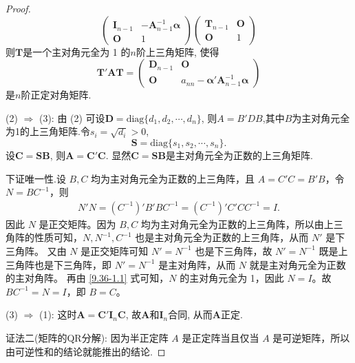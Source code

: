 \documentclass[../../main.tex]{subfiles}%
\begin{document}
\begin{proof}
\[\begin{pmatrix}
\boldsymbol{I}_{n - 1} & -\boldsymbol{A}_{n - 1}^{-1}\boldsymbol{\alpha} \\
\boldsymbol{O} & 1
\end{pmatrix}
\begin{pmatrix}
\boldsymbol{T}_{n - 1} & \boldsymbol{O} \\
\boldsymbol{O} & 1
\end{pmatrix}
\]
则$\boldsymbol{T}$是一个主对角元全为 1 的$n$阶上三角矩阵, 使得
\[
\boldsymbol{T}'\boldsymbol{A}\boldsymbol{T}=\begin{pmatrix}
\boldsymbol{D}_{n - 1} & \boldsymbol{O} \\
\boldsymbol{O} & a_{nn}-\boldsymbol{\alpha}'\boldsymbol{A}_{n - 1}^{-1}\boldsymbol{\alpha}
\end{pmatrix}
\]
是$n$阶正定对角矩阵.

(2) $\Rightarrow$ (3): 由 (2) 可设$\boldsymbol{D}=\text{diag}\{d_1, d_2, \cdots, d_n\}$, 则$A=B'DB$,其中$B$为主对角元全为1的上三角矩阵.令$s_i = \sqrt{d_i}>0$,
\[
\boldsymbol{S}=\text{diag}\{s_1, s_2, \cdots, s_n\}.
\]
设$\boldsymbol{C}=\boldsymbol{S}\boldsymbol{B}$, 则$\boldsymbol{A}=\boldsymbol{C}'\boldsymbol{C}$. 显然$\boldsymbol{C}=\boldsymbol{S}\boldsymbol{B}$是主对角元全为正数的上三角矩阵.

下证唯一性.设 \(B,C\) 均为主对角元全为正数的上三角阵，且 \(A = C'C = B'B\)，令 \(N = BC^{-1}\)，则
\begin{align}
N'N = \left( C^{-1} \right)'B'BC^{-1} = \left( C^{-1} \right)'C'CC^{-1} = I. \label{9.36-1.1}
\end{align}
因此 \(N\) 是正交矩阵。因为 \(B,C\) 均为主对角元全为正数的上三角阵，所以由上三角阵的性质可知，\(N,N^{-1},C^{-1}\) 也是主对角元全为正数的上三角阵，从而 \(N'\) 是下三角阵。
又由 \(N\) 是正交矩阵可知 \(N' = N^{-1}\) 也是下三角阵，故 \(N' = N^{-1}\) 既是上三角阵也是下三角阵，即 \(N' = N^{-1}\) 是主对角阵，从而 \(N\) 就是主对角元全为正数的主对角阵。
再由 \eqref{9.36-1.1} 式可知，\(N\) 的主对角元全为 1，因此 \(N = I\)。故 \(BC^{-1} = N = I\)，即 \(B = C\)。

(3) $\Rightarrow$ (1): 这时$\boldsymbol{A}=\boldsymbol{C}'\boldsymbol{I}_n\boldsymbol{C}$, 故$\boldsymbol{A}$和$\boldsymbol{I}_n$合同, 从而$\boldsymbol{A}$正定.

{\color{blue}证法二(矩阵的QR分解):}
因为半正定阵 $A$ 是正定阵当且仅当 $A$ 是可逆矩阵，所以由可逆性和的结论就能推出的结论.

\end{proof}
\end{document}
